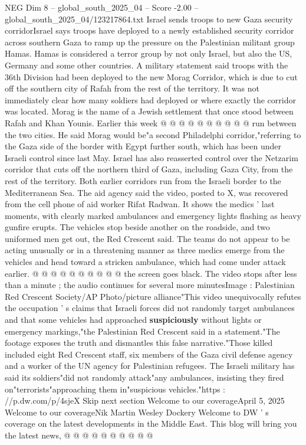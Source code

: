 \begin{textsample}{NEG Dim 8 – global\_south\_2025\_04 – Score -2.00 – global\_south\_2025\_04/123217864.txt}
Israel sends troops to new Gaza security corridorIsrael says troops have deployed to a newly established security corridor across southern Gaza to ramp up the pressure on the Palestinian militant group Hamas.
Hamas is considered a terror group by not only Israel, but also the US, Germany and some other countries.
A military statement said troops with the 36th Division had been deployed to the new Morag Corridor, which is due to cut off the southern city of Rafah from the rest of the territory.
It was not immediately clear how many soldiers had deployed or where exactly the corridor was located.
Morag is the name of a Jewish settlement that once stood between Rafah and Khan Younis.
Earlier this week @ @ @ @ @ @ @ @ @ @ run between the two cities.
He said Morag would be"a second Philadelphi corridor,"referring to the Gaza side of the border with Egypt further south, which has been under Israeli control since last May.
Israel has also reasserted control over the Netzarim corridor that cuts off the northern third of Gaza, including Gaza City, from the rest of the territory.
Both earlier corridors run from the Israeli border to the Mediterranean Sea.
The aid agency said the video, posted to X, was recovered from the cell phone of aid worker Rifat Radwan.
It shows the medics ' last moments, with clearly marked ambulances and emergency lights flashing as heavy gunfire erupts.
The vehicles stop beside another on the roadside, and two uniformed men get out, the Red Crescent said.
The teams do not appear to be acting unusually or in a threatening manner as three medics emerge from the vehicles and head toward a stricken ambulance, which had come under attack earlier. @ @ @ @ @ @ @ @ @ @ the screen goes black.
The video stops after less than a minute ; the audio continues for several more minutesImage : Palestinian Red Crescent Society/AP Photo/picture alliance"This video unequivocally refutes the occupation ' s claims that Israeli forces did not randomly target ambulances and that some vehicles had approached \textbf{suspiciously} without lights or emergency markings,"the Palestinian Red Crescent said in a statement."The footage exposes the truth and dismantles this false narrative."Those killed included eight Red Crescent staff, six members of the Gaza civil defense agency and a worker of the UN agency for Palestinian refugees.
The Israeli military has said its soldiers"did not randomly attack"any ambulances, insisting they fired on"terrorists"approaching them in"suspicious vehicles."https : //p.dw.com/p/4sjeX Skip next section Welcome to our coverageApril 5, 2025 Welcome to our coverageNik Martin Wesley Dockery Welcome to DW ' s coverage on the latest developments in the Middle East.
This blog will bring you the latest news, @ @ @ @ @ @ @ @ @ @

\end{textsample}

